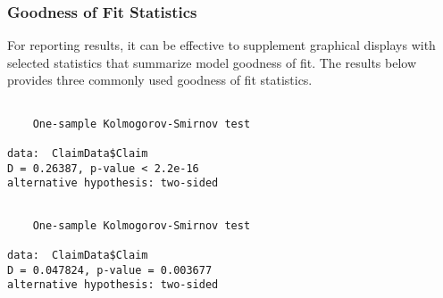 \documentclass[]{book}
\newenvironment{Shaded}{\begin{snugshade}}{\end{snugshade}}
\newcommand{\KeywordTok}[1]{\textcolor[rgb]{0.13,0.29,0.53}{\textbf{#1}}}
\newcommand{\DataTypeTok}[1]{\textcolor[rgb]{0.13,0.29,0.53}{#1}}
\newcommand{\DecValTok}[1]{\textcolor[rgb]{0.00,0.00,0.81}{#1}}
\newcommand{\StringTok}[1]{\textcolor[rgb]{0.31,0.60,0.02}{#1}}
\newcommand{\CommentTok}[1]{\textcolor[rgb]{0.56,0.35,0.01}{\textit{#1}}}
\newcommand{\OperatorTok}[1]{\textcolor[rgb]{0.81,0.36,0.00}{\textbf{#1}}}
\newcommand{\NormalTok}[1]{#1}
\theoremstyle{definition}
\theoremstyle{definition}
\theoremstyle{definition}
\theoremstyle{remark}
\begin{document}
\subsubsection{Goodness of Fit
Statistics}\label{goodness-of-fit-statistics}

For reporting results, it can be effective to supplement graphical
displays with selected statistics that summarize model goodness of fit.
The results below provides three commonly used goodness of fit
statistics.

\begin{Shaded}
\end{Shaded}

\begin{verbatim}

    One-sample Kolmogorov-Smirnov test

data:  ClaimData$Claim
D = 0.26387, p-value < 2.2e-16
alternative hypothesis: two-sided
\end{verbatim}

\begin{Shaded}
\end{Shaded}

\begin{verbatim}

    One-sample Kolmogorov-Smirnov test

data:  ClaimData$Claim
D = 0.047824, p-value = 0.003677
alternative hypothesis: two-sided
\end{verbatim}

\begin{Shaded}
\end{Shaded}
\end{document}
